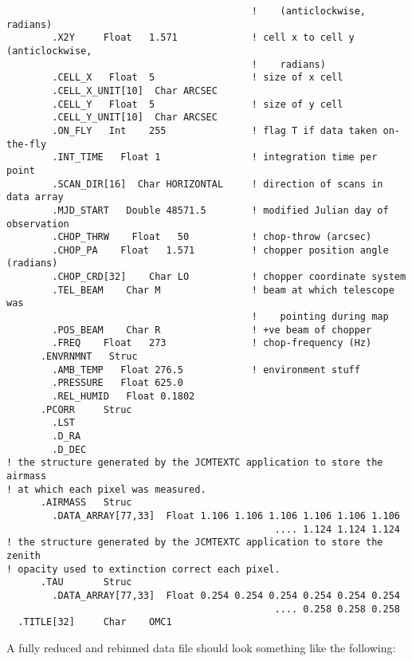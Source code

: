 \begin{small}
\begin{verbatim}
                                           !    (anticlockwise, radians)
        .X2Y     Float   1.571             ! cell x to cell y (anticlockwise,
                                           !    radians)
        .CELL_X   Float  5                 ! size of x cell
        .CELL_X_UNIT[10]  Char ARCSEC
        .CELL_Y   Float  5                 ! size of y cell
        .CELL_Y_UNIT[10]  Char ARCSEC
        .ON_FLY   Int    255               ! flag T if data taken on-the-fly
        .INT_TIME   Float 1                ! integration time per point
        .SCAN_DIR[16]  Char HORIZONTAL     ! direction of scans in data array
        .MJD_START   Double 48571.5        ! modified Julian day of observation
        .CHOP_THRW    Float   50           ! chop-throw (arcsec)
        .CHOP_PA    Float   1.571          ! chopper position angle (radians)
        .CHOP_CRD[32]    Char LO           ! chopper coordinate system
        .TEL_BEAM    Char M                ! beam at which telescope was 
                                           !    pointing during map
        .POS_BEAM    Char R                ! +ve beam of chopper
        .FREQ    Float   273               ! chop-frequency (Hz)
      .ENVRNMNT   Struc
        .AMB_TEMP   Float 276.5            ! environment stuff
        .PRESSURE   Float 625.0
        .REL_HUMID   Float 0.1802
      .PCORR     Struc
        .LST
        .D_RA
        .D_DEC
! the structure generated by the JCMTEXTC application to store the airmass
! at which each pixel was measured.
      .AIRMASS   Struc
        .DATA_ARRAY[77,33]  Float 1.106 1.106 1.106 1.106 1.106 1.106
                                               .... 1.124 1.124 1.124
! the structure generated by the JCMTEXTC application to store the zenith
! opacity used to extinction correct each pixel.
      .TAU       Struc
        .DATA_ARRAY[77,33]  Float 0.254 0.254 0.254 0.254 0.254 0.254
                                               .... 0.258 0.258 0.258
  .TITLE[32]     Char    OMC1
\end{verbatim}
\end{small}

\newpage    %

A fully reduced and rebinned data file should look something like the
following:

